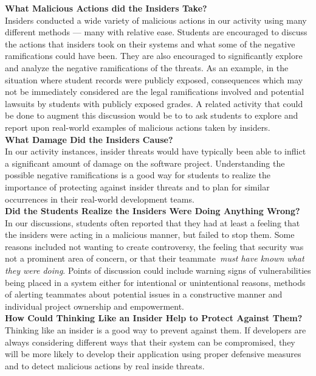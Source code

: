 \documentclass[conference]{IEEEtran}
\begin{document}
\textbf{What Malicious Actions did the Insiders Take?}\\
Insiders conducted a wide variety of malicious actions in our activity using many different methods --- many with relative ease. Students are encouraged to discuss the actions that insiders took on their systems and what some of the negative ramifications could have been. They are also encouraged to significantly explore and analyze the negative ramifications of the threats. As an example, in the situation where student records were publicly exposed, consequences which may not be immediately considered are the legal ramifications involved and potential lawsuits by students with publicly exposed grades. A related activity that could be done to augment this discussion would be to to ask students to explore and report upon real-world examples of malicious actions taken by insiders. \\


\textbf{What Damage Did the Insiders Cause?}\\
In our activity instances, insider threats would have typically been able to inflict a significant amount of damage on the software project. Understanding the possible negative ramifications is a good way for students to realize the importance of protecting against insider threats and to plan for similar occurrences in their real-world development teams. \\


\textbf{Did the Students Realize the Insiders Were Doing Anything Wrong?}\\
In our discussions, students often reported that they had at least a feeling that the insiders were acting in a malicious manner, but failed to stop them. Some reasons included not wanting to create controversy, the feeling that security was not a prominent area of concern, or that their teammate~\emph{must have known what they were doing}. Points of discussion could include warning signs of vulnerabilities being placed in a system either for intentional or unintentional reasons, methods of alerting teammates about potential issues in a constructive manner and individual project ownership and empowerment. \\

\textbf{How Could Thinking Like an Insider Help to Protect Against Them?}\\
Thinking like an insider is a good way to prevent against them. If developers are always considering different ways that their system can be compromised, they will be more likely to develop their application using proper defensive measures and to detect malicious actions by real inside threats. \\
\end{document}
